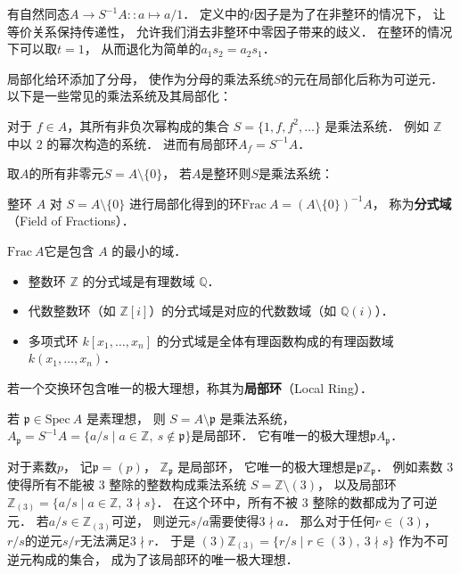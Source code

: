 有自然同态$A \to S^{-1}A :: a \mapsto a/1$．
定义中的$t$因子是为了在非整环的情况下，
让等价关系保持传递性，
允许我们消去非整环中零因子带来的歧义．
在整环的情况下可以取$t=1$，
从而退化为简单的$a_1s_2 = a_2s_1$．

局部化给环添加了分母，
使作为分母的乘法系统$S$的元在局部化后称为可逆元．
以下是一些常见的乘法系统及其局部化：

对于 $f \in A$，其所有非负次幂构成的集合 $S = \{1, f, f^2, \dots\}$ 是乘法系统．
例如 $\mathbb{Z}$ 中以 $2$ 的幂次构造的系统．
进而有局部环$A_f = S^{-1}A$．

取$A$的所有非零元$S = A \setminus \{0\}$，
若$A$是整环则$S$是乘法系统：

\begin{framed}
\noindent
整环 $A$ 对 $S = A \setminus \{0\}$ 进行局部化得到的环$\text{Frac} \ A = (A \setminus \{0\})^{-1} A $，
称为\textbf{分式域}（Field of Fractions）．
\end{framed}

$\text{Frac} \ A$它是包含 $A$ 的最小的域．

\begin{itemize}
    \item 整数环 $\mathbb{Z}$ 的分式域是有理数域 $\mathbb{Q}$．
    \item 代数整数环（如 $\mathbb{Z}[i]$）的分式域是对应的代数数域（如 $\mathbb{Q}(i)$）．
    \item 多项式环 $k[x_1, \dots, x_n]$ 的分式域是全体有理函数构成的有理函数域 $k(x_1, \dots, x_n)$．
\end{itemize}


\begin{framed}
\noindent
若一个交换环包含唯一的极大理想，称其为\textbf{局部环}（Local Ring）．
\end{framed}

若 $\mathfrak p \in \text{Spec} \ A$ 是素理想，
则 $S = A \setminus \mathfrak p$ 是乘法系统，
$A_\mathfrak p = S^{-1}A = \{ a/s \mid a \in \mathbb Z,\ s \notin \mathfrak p \}$是局部环．
它有唯一的极大理想$\mathfrak p A_\mathfrak p$．


对于素数$p$，
记$\mathfrak p = (p)$，
$\mathbb{Z}_\mathfrak p$ 是局部环，
它唯一的极大理想是$\mathfrak p \mathbb Z_\mathfrak p$．
例如素数 $3$ 使得所有不能被 $3$ 整除的整数构成乘法系统
$S = \mathbb{Z} \setminus (3)$，
以及局部环 $\mathbb{Z}_{(3)} = \{ a/s \mid a \in \mathbb Z,\ 3 \nmid s \}$．
在这个环中，所有不被 $3$ 整除的数都成为了可逆元．
若$a/s \in \mathbb{Z}_{(3)}$可逆，
则逆元$s/a$需要使得$3 \nmid a$．
那么对于任何$r\in (3)$，
$r/s$的逆元$s/r$无法满足$3 \nmid r$．
于是 $(3)\mathbb{Z}_{(3)} = \{ r/s  \mid r \in (3),\ 3 \nmid s \}$ 作为不可逆元构成的集合，
成为了该局部环的唯一极大理想．



